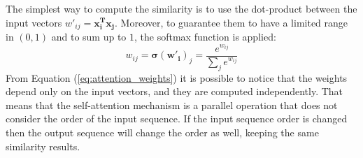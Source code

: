 The simplest way to compute the similarity is to use the dot-product between the 
input vectors $w'_{ij} = \boldsymbol{x_i^T x_j}$. Moreover, to guarantee them to have a limited 
range in $(0, 1)$ and to sum up to $1$, the softmax function is applied:
\begin{equation}
    w_{ij} = \boldsymbol{\sigma}(\boldsymbol{w'_i})_j = 
    \frac{e^{w_{ij}}}{\sum_{j} e^{w_{ij}}}
    \label{eq:attention_weights}
\end{equation}
From Equation (\ref{eq:attention_weights}) it is possible to notice that the 
weights depend only on the input vectors, and they are computed independently. 
That means that the self-attention mechanism is a parallel operation that does 
not consider the order of the input sequence. If the input sequence order is 
changed then the output sequence will change the order as well, keeping the 
same similarity results.

